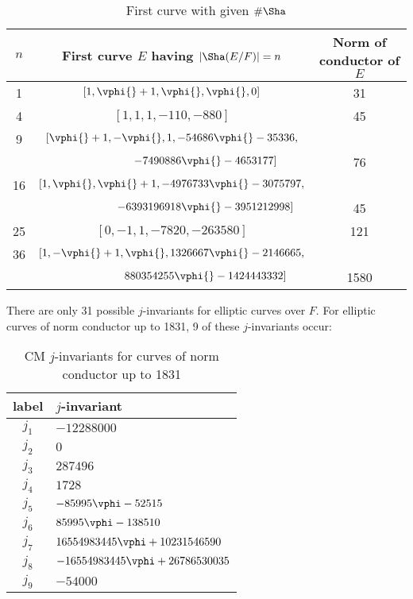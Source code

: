 \documentclass{amsart}
\begin{document}
\begin{center}
\begin{table}[h]
\caption{First curve with given $\#\Sha$\label{table:sha}}
\begin{tabular}{|c | c | c |}
\hline 
$n$ &{\bf First curve $E$ having $|\Sha(E/F)| = n$ }& {\bf Norm of conductor of $E$} \\
\hline 
1 & $[1,\vphi{}+1,\vphi{},\vphi{},0]$ & 31 \\\hline 
4 & $[1, 1, 1, -110, -880]$ & 45 \\\hline 
9 & $[\vphi{}+1,-\vphi{},1,-54686\vphi{}-35336,$& \\
  & $\qquad\qquad\qquad -7490886\vphi{}-4653177]$ & 76 \\\hline 
16 & $[1,\vphi{},\vphi{}+1,-4976733\vphi{}-3075797,$&\\
   & $\qquad\qquad\qquad -6393196918\vphi{}-3951212998]$ & 45 \\\hline 
25 & $[0, -1, 1, -7820, -263580]$ & 121 \\\hline 
36 & $[1,-\vphi{}+1,\vphi{},1326667\vphi{}-2146665,$ & \\
   & $\qquad\qquad\qquad 880354255\vphi{}-1424443332]$ & 1580 \\
\hline
\end{tabular}
\end{table}
\end{center}

There are only 31 possible $j$-invariants for elliptic curves over $F$.  
For elliptic curves of norm conductor up to 1831, 9 of these $j$-invariants occur:

\begin{center}
\begin{table}[h]
\caption{CM $j$-invariants for curves of norm conductor up to 1831\label{table:CM-j-invariants}}
\begin{tabular}{|c|l|}\hline
{\bf label} &{\bf $j$-invariant} \\\hline
$j_1$ & $-12288000$ \\\hline
$j_2$ & $0$ \\\hline
$j_3$ & $ 287496$ \\\hline
$j_4$ & $1728$ \\\hline
$j_5$ & $-85995\vphi - 52515$ \\\hline
$j_6$ & $85995\vphi - 138510$ \\\hline
$j_7$ & $16554983445\vphi + 10231546590$ \\\hline
$j_8$ & $-16554983445\vphi + 26786530035$ \\\hline
$j_9$ & $-54000$ \\\hline
\end{tabular}
\end{table}
\end{center}
\end{document}
